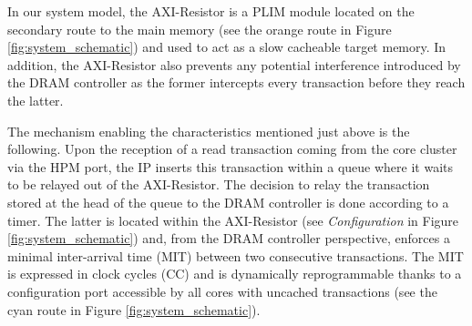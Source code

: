 %

    In our system model, the AXI-Resistor is a PLIM module \cite{PLIM20} located on the secondary route to the main memory (see the orange route in Figure \ref{fig:system_schematic}) and used to act as a slow cacheable target memory.
    In addition, the AXI-Resistor also prevents any potential interference introduced by the DRAM controller as the former intercepts every transaction before they reach the latter.

    The mechanism enabling the characteristics mentioned just above is the following.
    Upon the reception of a read transaction coming from the core cluster via the HPM port, the IP inserts this transaction within a queue where it waits to be relayed out of the AXI-Resistor.
    The decision to relay the transaction stored at the head of the queue to the DRAM controller is done according to a timer.
    The latter is located within the AXI-Resistor (see \emph{Configuration} in Figure \ref{fig:system_schematic}) and, from the DRAM controller perspective, enforces a minimal inter-arrival time (MIT) between two consecutive transactions.
    The MIT is expressed in clock cycles (CC) and is dynamically reprogrammable thanks to a configuration port accessible by all cores with uncached transactions (see the cyan route in Figure \ref{fig:system_schematic}).
